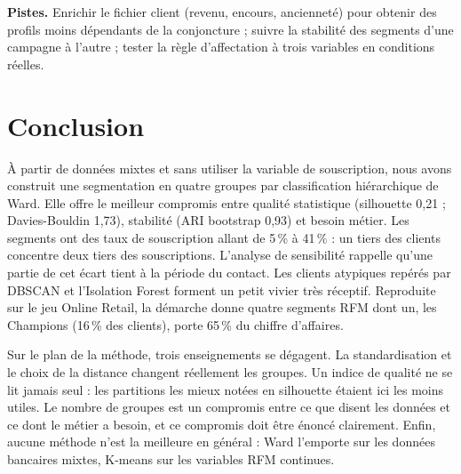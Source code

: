 \documentclass[11pt,a4paper]{article}
\begin{document}
\textbf{Pistes.} Enrichir le fichier client (revenu, encours, ancienneté) pour obtenir des profils moins dépendants de la conjoncture ; suivre la stabilité des segments d'une campagne à l'autre ; tester la règle d'affectation à trois variables en conditions réelles.

\section{Conclusion}

À partir de données mixtes et sans utiliser la variable de souscription, nous avons construit une segmentation en quatre groupes par classification hiérarchique de Ward. Elle offre le meilleur compromis entre qualité statistique (silhouette 0,21 ; Davies-Bouldin 1,73), stabilité (ARI bootstrap 0,93) et besoin métier. Les segments ont des taux de souscription allant de 5\,\% à 41\,\% : un tiers des clients concentre deux tiers des souscriptions. L'analyse de sensibilité rappelle qu'une partie de cet écart tient à la période du contact. Les clients atypiques repérés par DBSCAN et l'Isolation Forest forment un petit vivier très réceptif. Reproduite sur le jeu Online Retail, la démarche donne quatre segments RFM dont un, les Champions (16\,\% des clients), porte 65\,\% du chiffre d'affaires.

Sur le plan de la méthode, trois enseignements se dégagent. La standardisation et le choix de la distance changent réellement les groupes. Un indice de qualité ne se lit jamais seul : les partitions les mieux notées en silhouette étaient ici les moins utiles. Le nombre de groupes est un compromis entre ce que disent les données et ce dont le métier a besoin, et ce compromis doit être énoncé clairement. Enfin, aucune méthode n'est la meilleure en général : Ward l'emporte sur les données bancaires mixtes, K-means sur les variables RFM continues.
\end{document}

